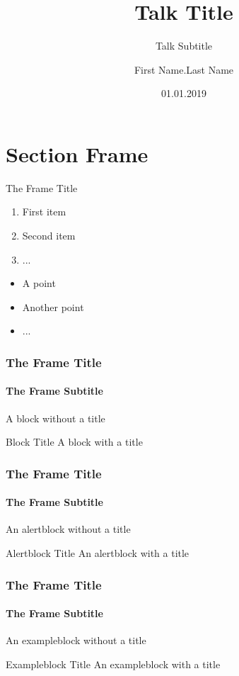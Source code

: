 \documentclass[14pt]{beamer}
\title[Small Title]{Talk Title}
\subtitle{Talk Subtitle}
\author{First Name.Last Name}
\institute[Inst]{Institute}
\date{01.01.2019}
\begin{document}
\begin{frame}[plain]
  \maketitle
\end{frame}

\section{Section Frame}
\frame{\sectionpage}

\begin{frame}{The Frame Title}

  \begin{enumerate}
    \item First item
    \item Second item
    \item ...
  \end{enumerate}

  \vfill

  \begin{itemize}
    \item A point
    \item Another point
    \item ...
  \end{itemize}
  
\end{frame}

\begin{frame}
  \frametitle{The Frame Title}
  \framesubtitle{The Frame Subtitle}

  \begin{block}{}
    A block without a title
  \end{block}

  \vfill

  \begin{block}{Block Title}
    A block with a title
  \end{block}

\end{frame}

\begin{frame}
  \frametitle{The Frame Title}
  \framesubtitle{The Frame Subtitle}
  
  \begin{alertblock}{}
    An alertblock without a title
  \end{alertblock}

  \vfill

  \begin{alertblock}{Alertblock Title}
    An alertblock with a title
  \end{alertblock}

\end{frame}

\begin{frame}
  \frametitle{The Frame Title}
  \framesubtitle{The Frame Subtitle}

  \begin{exampleblock}{}
    An exampleblock without a title
  \end{exampleblock}

  \vfill

  \begin{exampleblock}{Exampleblock Title}
    An exampleblock with a title
  \end{exampleblock}

\end{frame}
\end{document}

